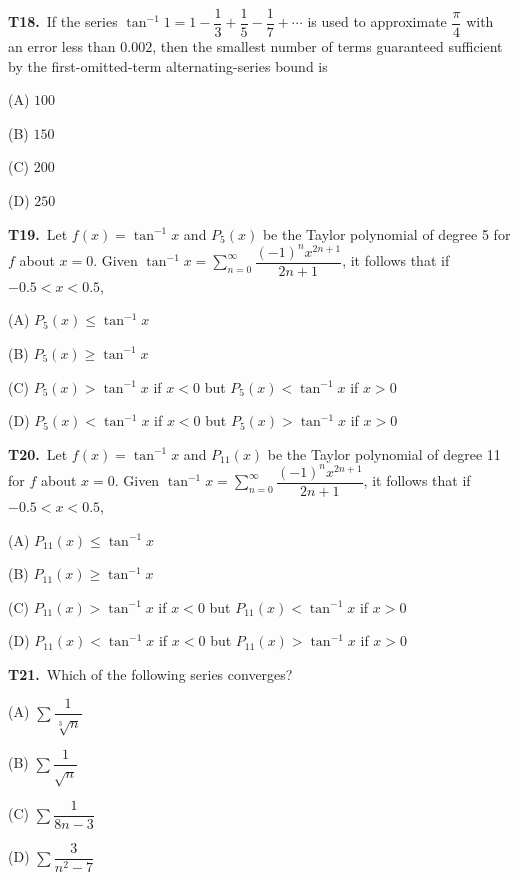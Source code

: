 \documentclass[11pt]{article}
\begin{document}
\bigskip\noindent\textbf{T18.}\ If the series $\tan^{-1}1 = 1-\dfrac{1}{3}+\dfrac{1}{5}-\dfrac{1}{7}+\cdots$ is used to approximate $\dfrac{\pi}{4}$ with an error less than $0.002$, then the smallest number of terms guaranteed sufficient by the first-omitted-term alternating-series bound is
\begin{list}{}{\setlength{\leftmargin}{3em}\setlength{\labelwidth}{2.5em}\setlength{\itemsep}{0pt}\setlength{\topsep}{2pt}}
\item[(A)] $100$
\item[(B)] $150$
\item[(C)] $200$
\item[(D)] $250$
\end{list}

\bigskip\noindent\textbf{T19.}\ Let $f(x)=\tan^{-1}x$ and $P_5(x)$ be the Taylor polynomial of degree 5 for $f$ about $x=0$. Given $\tan^{-1}x = \displaystyle\sum_{n=0}^\infty \dfrac{(-1)^n x^{2n+1}}{2n+1}$, it follows that if $-0.5<x<0.5$,
\begin{list}{}{\setlength{\leftmargin}{3em}\setlength{\labelwidth}{2.5em}\setlength{\itemsep}{0pt}\setlength{\topsep}{2pt}}
\item[(A)] $P_5(x)\leq \tan^{-1}x$
\item[(B)] $P_5(x)\geq \tan^{-1}x$
\item[(C)] $P_5(x)>\tan^{-1}x$ if $x<0$ but $P_5(x)<\tan^{-1}x$ if $x>0$
\item[(D)] $P_5(x)<\tan^{-1}x$ if $x<0$ but $P_5(x)>\tan^{-1}x$ if $x>0$
\end{list}

\bigskip\noindent\textbf{T20.}\ Let $f(x)=\tan^{-1}x$ and $P_{11}(x)$ be the Taylor polynomial of degree 11 for $f$ about $x=0$. Given $\tan^{-1}x = \displaystyle\sum_{n=0}^\infty \dfrac{(-1)^n x^{2n+1}}{2n+1}$, it follows that if $-0.5<x<0.5$,
\begin{list}{}{\setlength{\leftmargin}{3em}\setlength{\labelwidth}{2.5em}\setlength{\itemsep}{0pt}\setlength{\topsep}{2pt}}
\item[(A)] $P_{11}(x)\leq \tan^{-1}x$
\item[(B)] $P_{11}(x)\geq \tan^{-1}x$
\item[(C)] $P_{11}(x)>\tan^{-1}x$ if $x<0$ but $P_{11}(x)<\tan^{-1}x$ if $x>0$
\item[(D)] $P_{11}(x)<\tan^{-1}x$ if $x<0$ but $P_{11}(x)>\tan^{-1}x$ if $x>0$
\end{list}

\bigskip\noindent\textbf{T21.}\ Which of the following series converges?
\begin{list}{}{\setlength{\leftmargin}{3em}\setlength{\labelwidth}{2.5em}\setlength{\itemsep}{0pt}\setlength{\topsep}{2pt}}
\item[(A)] $\displaystyle\sum \dfrac{1}{\sqrt[3]{n}}$
\item[(B)] $\displaystyle\sum \dfrac{1}{\sqrt{n}}$
\item[(C)] $\displaystyle\sum \dfrac{1}{8n-3}$
\item[(D)] $\displaystyle\sum \dfrac{3}{n^2-7}$
\end{list}
\end{document}
